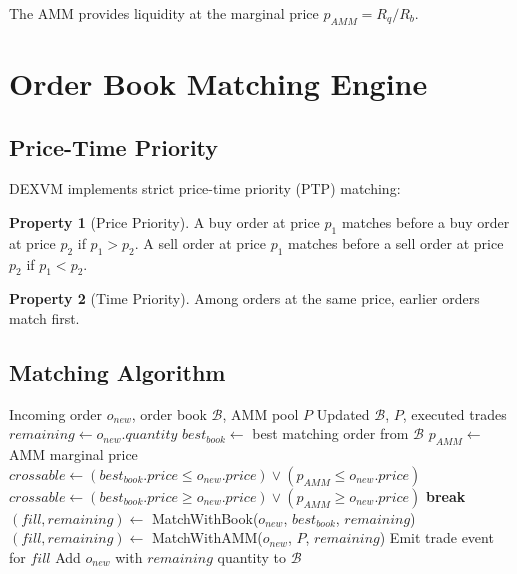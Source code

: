 \documentclass[11pt,a4paper]{article}
\theoremstyle{definition}
\newtheorem{property}{Property}
\begin{document}
The AMM provides liquidity at the marginal price $p_{AMM} = R_q / R_b$.

\section{Order Book Matching Engine}

\subsection{Price-Time Priority}

DEXVM implements strict price-time priority (PTP) matching:

\begin{property}[Price Priority]
A buy order at price $p_1$ matches before a buy order at price $p_2$ if $p_1 > p_2$. A sell order at price $p_1$ matches before a sell order at price $p_2$ if $p_1 < p_2$.
\end{property}

\begin{property}[Time Priority]
Among orders at the same price, earlier orders match first.
\end{property}

\subsection{Matching Algorithm}

\begin{algorithm}
\caption{Order Matching}
\begin{algorithmic}[1]
\Require Incoming order $o_{new}$, order book $\mathcal{B}$, AMM pool $P$
\Ensure Updated $\mathcal{B}$, $P$, executed trades
\State $remaining \gets o_{new}.quantity$
    \State $best_{book} \gets$ best matching order from $\mathcal{B}$
    \State $p_{AMM} \gets$ AMM marginal price
        \State $crossable \gets (best_{book}.price \leq o_{new}.price) \lor (p_{AMM} \leq o_{new}.price)$
    \Else
        \State $crossable \gets (best_{book}.price \geq o_{new}.price) \lor (p_{AMM} \geq o_{new}.price)$
    \EndIf
        \State \textbf{break}
    \EndIf
        \State $(fill, remaining) \gets$ MatchWithBook($o_{new}$, $best_{book}$, $remaining$)
    \Else
        \State $(fill, remaining) \gets$ MatchWithAMM($o_{new}$, $P$, $remaining$)
    \EndIf
    \State Emit trade event for $fill$
\EndWhile
{}
    \State Add $o_{new}$ with $remaining$ quantity to $\mathcal{B}$
\EndIf
\end{algorithmic}
\end{algorithm}
\end{document}
